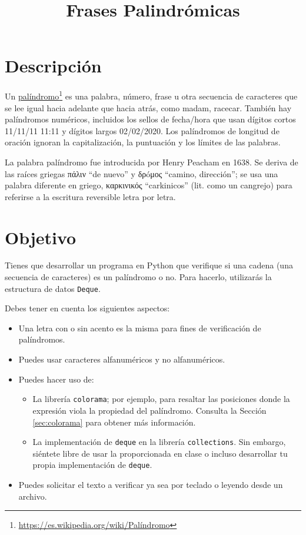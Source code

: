 \documentclass[10pt,a4paper]{article}
\title{{\huge Frases Palindrómicas}}
\date{}
\begin{document}
\maketitle


\section{Descripción}

Un \href{https://es.wikipedia.org/wiki/Pal%C3%ADndromo}{palíndromo}\footnote{\href{https://es.wikipedia.org/wiki/Palíndromo}{https://es.wikipedia.org/wiki/Palíndromo}} es una palabra, número, frase u otra secuencia de caracteres que se lee igual hacia adelante que hacia atrás, como madam, racecar. También hay palíndromos numéricos, incluidos los sellos de fecha/hora que usan dígitos cortos 11/11/11 11:11 y dígitos largos 02/02/2020. Los palíndromos de longitud de oración ignoran la capitalización, la puntuación y los límites de las palabras.

La palabra palíndromo fue introducida por Henry Peacham en 1638. Se deriva de las raíces griegas \textgreek{πάλιν} ``de nuevo'' y \textgreek{δρóμος} ``camino, dirección''; se usa una palabra diferente en griego, \textgreek{καρκινικός} ``carkinicos'' (lit. como un cangrejo) para referirse a la escritura reversible letra por letra.

\section{Objetivo}
Tienes que desarrollar un programa en Python que verifique si una cadena (una secuencia de caracteres) es un palíndromo o no. Para hacerlo, utilizarás la estructura de datos \texttt{Deque}.

Debes tener en cuenta los siguientes aspectos:

\begin{itemize}
\item Una letra con o sin acento es la misma para fines de verificación de palíndromos.
\item Puedes usar caracteres alfanuméricos y no alfanuméricos.
\item Puedes hacer uso de:
	\begin{itemize}
	\item La librería \texttt{colorama}; por ejemplo, para resaltar las posiciones donde la expresión viola la propiedad del palíndromo. Consulta la Sección \ref{sec:colorama} para obtener más información.
	\item La implementación de \texttt{deque} en la librería \texttt{collections}. Sin embargo, siéntete libre de usar la proporcionada en clase o incluso desarrollar tu propia implementación de \texttt{deque}.
	\end{itemize}
\item Puedes solicitar el texto a verificar ya sea por teclado o leyendo desde un archivo.
\end{itemize}
\end{document}
